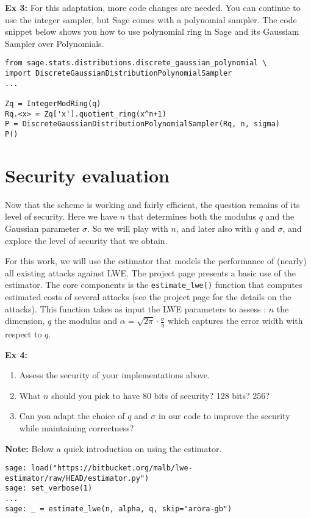 \documentclass[10pt,a4paper,nobib]{tufte-handout}
\begin{document}
\textbf{Ex 3:} For this adaptation, more code changes are needed. You can continue to use the integer sampler, but Sage comes with a polynomial sampler. The code snippet below shows you how to use polynomial ring in Sage and its Gaussiam Sampler over Polynomials.
\lstset{language=sage,label= ,caption= ,captionpos=b,numbers=none}
\begin{lstlisting}
from sage.stats.distributions.discrete_gaussian_polynomial \
import DiscreteGaussianDistributionPolynomialSampler
...

Zq = IntegerModRing(q)
Rq.<x> = Zq['x'].quotient_ring(x^n+1)
P = DiscreteGaussianDistributionPolynomialSampler(Rq, n, sigma)
P()
\end{lstlisting}


\section{Security evaluation}

Now that the scheme is working and fairly efficient, the question remains of its level of security. Here we have $n$ that determines both the modulus $q$ and the Gaussian parameter $\sigma$. So we will play with $n$, and later also with $q$ and $\sigma$, and explore the level of security that we obtain.

For this work, we will use the estimator that models the performance of (nearly) all existing attacks against LWE\@. The project page presents a basic use of the estimator. The core components is the \texttt{estimate\_lwe()} function that computes estimated costs of several attacks (see the project page for the details on the attacks). This function takes as input the LWE parameters to assess : $n$ the dimension, $q$ the modulus and $\alpha = \sqrt{2\pi}\cdot \frac{\sigma}{q}$ which captures the error width with respect to $q$. 

\textbf{Ex 4:}
\begin{enumerate}
  \item Assess the security of your implementations above.
  \item What $n$ should you pick to have 80 bits of security? 128 bits? 256?
  \item Can you adapt the choice of $q$ and $\sigma$ in our code to improve the security while maintaining correctness?
\end{enumerate}

\textbf{Note:} Below a quick introduction on using the estimator.
\lstset{language=sage,label= ,caption= ,captionpos=b,numbers=none}
\begin{lstlisting}
sage: load("https://bitbucket.org/malb/lwe-estimator/raw/HEAD/estimator.py")
sage: set_verbose(1)
...
sage: _ = estimate_lwe(n, alpha, q, skip="arora-gb")
\end{lstlisting}
\end{document}
